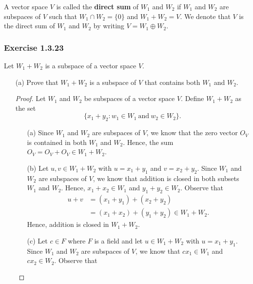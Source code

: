 \begin{definition}
    A vector space \( V  \) is called the \textbf{direct sum} of \( W_{1}  \) and \( W_{2}  \) if \( W_{1}  \) and \( W_{2}  \) are subspaces of \( V  \) such that \( W_{1} \cap W_{2} = \{ 0  \}  \) and \( W_{1} + W_{2} = V  \). We denote that \( V  \) is the direct sum of \( W_{1}  \) and \( W_{2}  \) by writing \( V = W_{1} \oplus W_{2} \).
\end{definition}
 
\subsubsection{Exercise 1.3.23} Let \( W_{1} + W_{2}  \) is a subspace of a vector space \( V  \).
\begin{enumerate}
    \item[(a)] Prove that \( W_{1} + W_{2}  \) is a subspace of \( V  \) that contains both \( W_{1}  \) and \( W_{2}  \).
        \begin{proof}
        Let  \( W_{1}  \) and \( W_{2}  \) be subspaces of a vector space \( V   \). Define \( W_{1} + W_{2}  \) as the set  
        \[  \{ x_{1} + y_{2} :  w_{1} \in W_{1}  \ \text{and} \ w_{2} \in W_{2}  \}.  \]
        \begin{enumerate}
            \item[(a)] Since \( W_{1}  \) and \( W_{2}  \) are subspaces of \( V  \), we know that the zero vector \( O_{V} \) is contained in both \( W_{1}  \) and \( W_{2} \). Hence, the sum \(  O_{V} = O_{V } + O_{V} \in W_{1} + W_{2}   \).
            \item[(b)] Let \( u,v \in W_{1} + W_{2} \) with \( u = x_{1} + y_{1}  \) and \(  v  = x_{2} + y_{2}  \). Since \( W_{1}  \) and \( W_{2}  \) are subspaces of \( V  \), we know that addition is closed in both subsets \( W_{1}  \) and \( W_{2}  \). Hence, \( x_{1} + x_{2} \in W_{1}  \) and \( y_{1} + y_{2} \in W_{2}  \). Observe that 
                \begin{align*}
                    u + v &= (x_{1} + y_{1}) + (x_{2} + y_{2}) \\
                          &= (x_{1} + x_{2}) + (y_{1} + y_{2}) \in W_{1} + W_{2}.
                \end{align*}
                Hence,  addition is closed in \( W_{1} + W_{2} \).
            \item[(c)] Let \( c \in F  \) where \( F  \) is a field and let \( u \in W_{1} + W_{2}  \) with \( u = x_{1} + y_{1}  \). Since \( W_{1}  \) and \( W_{2}  \) are subspaces of \( V  \), we know that  \( cx_{1} \in W_{1}   \) and \( cx_{2} \in W_{2}  \). Observe that 

\end{enumerate}
\end{proof}
\end{enumerate}

